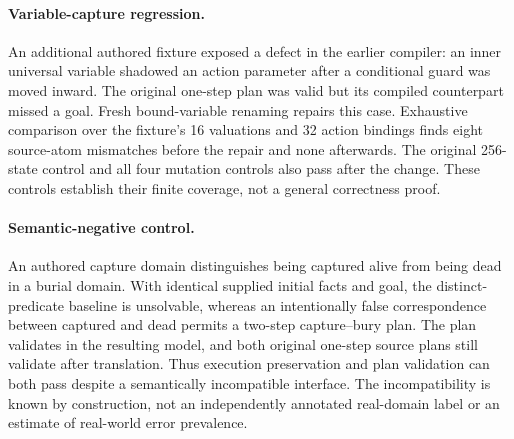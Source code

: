 \documentclass[letterpaper]{article}
\begin{document}
\paragraph{Variable-capture regression.}
An additional authored fixture exposed a defect in the earlier compiler: an inner universal variable shadowed an action parameter after a conditional guard was moved inward. The original one-step plan was valid but its compiled counterpart missed a goal. Fresh bound-variable renaming repairs this case. Exhaustive comparison over the fixture's 16 valuations and 32 action bindings finds eight source-atom mismatches before the repair and none afterwards. The original 256-state control and all four mutation controls also pass after the change. These controls establish their finite coverage, not a general correctness proof.

\paragraph{Semantic-negative control.}
An authored capture domain distinguishes being captured alive from being dead in a burial domain. With identical supplied initial facts and goal, the distinct-predicate baseline is unsolvable, whereas an intentionally false correspondence between captured and dead permits a two-step capture--bury plan. The plan validates in the resulting model, and both original one-step source plans still validate after translation. Thus execution preservation and plan validation can both pass despite a semantically incompatible interface. The incompatibility is known by construction, not an independently annotated real-domain label or an estimate of real-world error prevalence.
\end{document}

